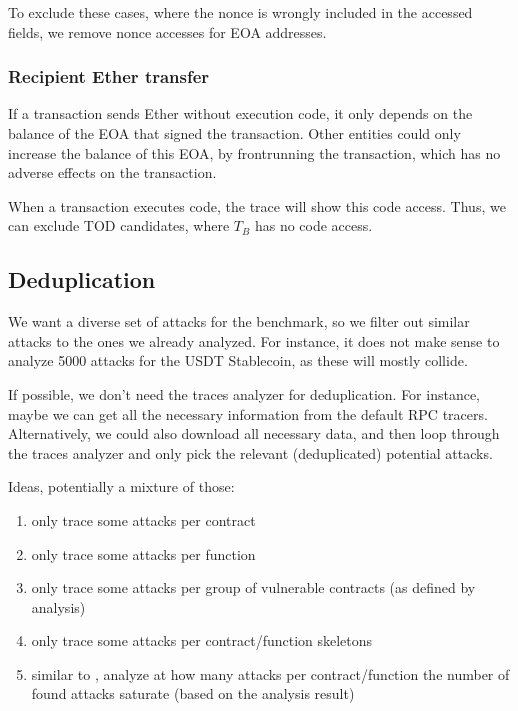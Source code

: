 \documentclass[draft,final]{vutinfth} %
\begin{document}
To exclude these cases, where the nonce is wrongly included in the accessed fields, we remove nonce accesses for EOA addresses.

\subsubsection{Recipient Ether transfer}

If a transaction sends Ether without execution code, it only depends on the balance of the EOA that signed the transaction. Other entities could only increase the balance of this EOA, by frontrunning the transaction, which has no adverse effects on the transaction.

When a transaction executes code, the trace will show this code access. Thus, we can exclude TOD candidates, where $T_B$ has no code access.


\subsection{Deduplication}

We want a diverse set of attacks for the benchmark, so we filter out similar attacks to the ones we already analyzed. For instance, it does not make sense to analyze 5000 attacks for the USDT Stablecoin, as these will mostly collide.

If possible, we don't need the traces analyzer for deduplication. For instance, maybe we can get all the necessary information from the default RPC tracers.
Alternatively, we could also download all necessary data, and then loop through the traces analyzer and only pick the relevant (deduplicated) potential attacks.

Ideas, potentially a mixture of those:

\begin{enumerate}
    \item only trace some attacks per contract
    \item only trace some attacks per function
    \item only trace some attacks per group of vulnerable contracts (as defined by analysis)
    \item only trace some attacks per contract/function skeletons
    \item similar to \cite{}, analyze at how many attacks per contract/function the number of found attacks saturate (based on the analysis result)
\end{enumerate}
\end{document}
